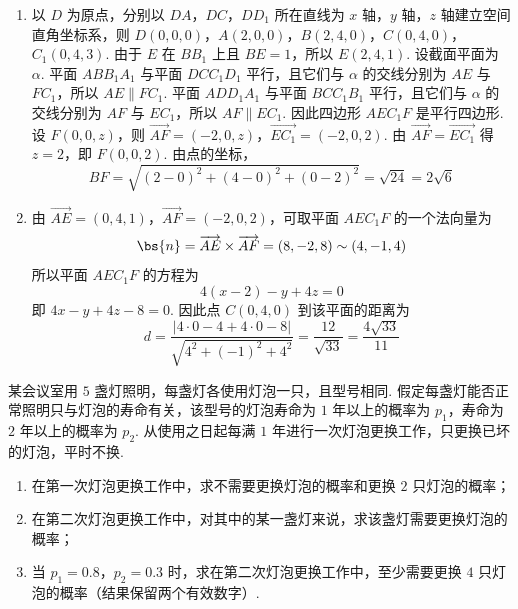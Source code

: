 \begin{solution}
\begin{enumerate}
\item 以 \(D\) 为原点，分别以 \(DA\)，\(DC\)，\(DD_1\) 所在直线为 \(x\) 轴，\(y\) 轴，\(z\) 轴建立空间直角坐标系，则
\(D(0,0,0)\)，\(A(2,0,0)\)，\(B(2,4,0)\)，\(C(0,4,0)\)，\(C_1(0,4,3)\).
由于 \(E\) 在 \(BB_1\) 上且 \(BE=1\)，所以 \(E(2,4,1)\). 设截面平面为 \(\alpha\). 平面 \(ABB_1A_1\) 与平面 \(DCC_1D_1\) 平行，且它们与 \(\alpha\) 的交线分别为 \(AE\) 与 \(FC_1\)，所以 \(AE\parallel FC_1\). 平面 \(ADD_1A_1\) 与平面 \(BCC_1B_1\) 平行，且它们与 \(\alpha\) 的交线分别为 \(AF\) 与 \(EC_1\)，所以 \(AF\parallel EC_1\). 因此四边形 \(AEC_1F\) 是平行四边形. 设 \(F(0,0,z)\)，则
\(\overrightarrow{AF}=(-2,0,z)\)，\(\overrightarrow{EC_1}=(-2,0,2)\).
由 \(\overrightarrow{AF}=\overrightarrow{EC_1}\) 得 \(z=2\)，即 \(F(0,0,2)\).
由点的坐标，
\[
BF=\sqrt{(2-0)^2+(4-0)^2+(0-2)^2}=\sqrt{24}=2\sqrt6
\]
\item 由 \(\overrightarrow{AE}=(0,4,1)\)，\(\overrightarrow{AF}=(-2,0,2)\)，可取平面 \(AEC_1F\) 的一个法向量为
\[
\bs{n}=\overrightarrow{AE}\times\overrightarrow{AF}=(8,-2,8)\sim(4,-1,4)
\]
所以平面 \(AEC_1F\) 的方程为
\[
4(x-2)-y+4z=0
\]
即 \(4x-y+4z-8=0\). 因此点 \(C(0,4,0)\) 到该平面的距离为
\[
d=\frac{|4\cdot0-4+4\cdot0-8|}{\sqrt{4^2+(-1)^2+4^2}}=\frac{12}{\sqrt{33}}=\frac{4\sqrt{33}}{11}
\]
\end{enumerate}
\end{solution}

\begin{problem}
某会议室用 \(5\) 盏灯照明，每盏灯各使用灯泡一只，且型号相同. 假定每盏灯能否正常照明只与灯泡的寿命有关，该型号的灯泡寿命为 \(1\) 年以上的概率为 \(p_1\)，寿命为 \(2\) 年以上的概率为 \(p_2\). 从使用之日起每满 \(1\) 年进行一次灯泡更换工作，只更换已坏的灯泡，平时不换.

\begin{enumerate}
\item 在第一次灯泡更换工作中，求不需要更换灯泡的概率和更换 \(2\) 只灯泡的概率；
\item 在第二次灯泡更换工作中，对其中的某一盏灯来说，求该盏灯需要更换灯泡的概率；
\item 当 \(p_1 = 0.8\)，\(p_2 = 0.3\) 时，求在第二次灯泡更换工作中，至少需要更换 \(4\) 只灯泡的概率（结果保留两个有效数字）.
\end{enumerate}
\end{problem}

